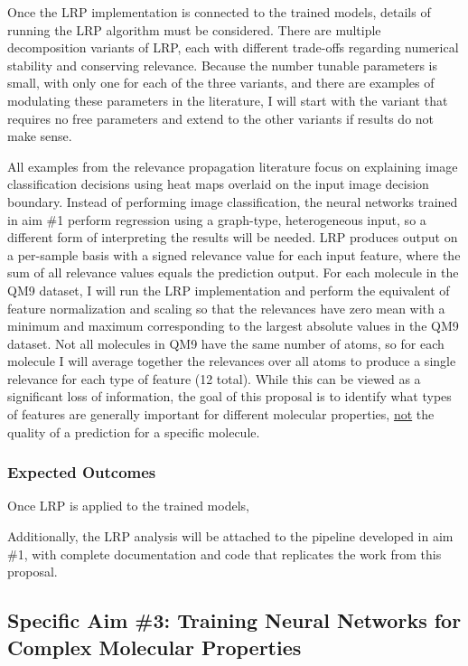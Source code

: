 \documentclass[12pt]{article}
\begin{document}
Once the LRP implementation is connected to the trained models, details of running the LRP algorithm must be considered. There are multiple decomposition variants of LRP, each with different trade-offs regarding numerical stability and conserving relevance\cite{Binder2016}. Because the number tunable parameters is small, with only one for each of the three variants, and there are examples of modulating these parameters in the literature, I will start with the variant that requires no free parameters and extend to the other variants if results do not make sense.

All examples from the relevance propagation literature focus on explaining image classification decisions using heat maps overlaid on the input image decision boundary. Instead of performing image classification, the neural networks trained in aim \#1 perform regression using a graph-type, heterogeneous input, so a different form of interpreting the results will be needed. LRP produces output on a per-sample basis with a signed relevance value for each input feature, where the sum of all relevance values equals the prediction output. For each molecule in the QM9 dataset, I will run the LRP implementation and perform the equivalent of feature normalization and scaling so that the relevances have zero mean with a minimum and maximum corresponding to the largest absolute values in the QM9 dataset. Not all molecules in QM9 have the same number of atoms, so for each molecule I will average together the relevances over all atoms to produce a single relevance for each type of feature (12 total). While this can be viewed as a significant loss of information, the goal of this proposal is to identify what types of features are generally important for different molecular properties, \uline{not} the quality of a prediction for a specific molecule.

\subsubsection{Expected Outcomes}
\label{sec:orgaef7b5d}

Once LRP is applied to the trained models, 

Additionally, the LRP analysis will be attached to the pipeline developed in aim \#1, with complete documentation and code that replicates the work from this proposal.

\subsection{Specific Aim \#3: Training Neural Networks for Complex Molecular Properties}
\label{sec:org509f821}
\end{document}
